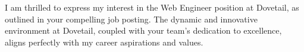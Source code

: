 \documentclass[12pt, a4paper]{./awesome-cv/awesome-cv}
\begin{document}
\makecvheader[C]

\makecvfooter
 {}
  {}
  {}

\makelettertitle
\begin{cvletter}





I am thrilled to express my interest in the Web Engineer position at Dovetail, as outlined in your compelling job posting. The dynamic and innovative environment at Dovetail, coupled with your team's dedication to excellence, aligns perfectly with my career aspirations and values.


\end{cvletter}
\end{document}

